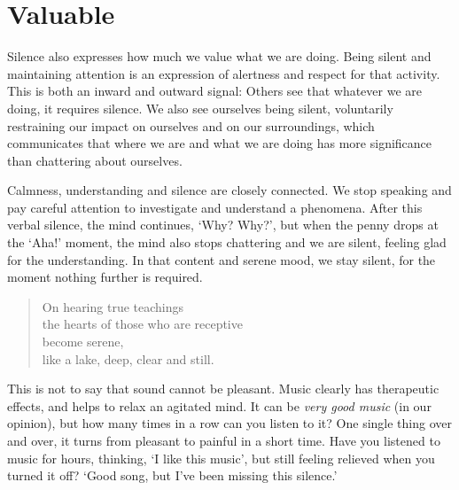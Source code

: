 \section{Valuable}


Silence also expresses how much we value what we are doing. Being silent
and maintaining attention is an expression of alertness and respect for
that activity. This is both an inward and outward signal: Others see
that whatever we are doing, it requires silence. We also see ourselves
being silent, voluntarily restraining our impact on ourselves and on our
surroundings, which communicates that where we are and what we are doing
has more significance than chattering about ourselves.

Calmness, understanding and silence are closely connected. We stop
speaking and pay careful attention to investigate and understand a
phenomena. After this verbal silence, the mind continues, `Why? Why?',
but when the penny drops at the `Aha!' moment, the mind also stops
chattering and we are silent, feeling glad for the understanding. In
that content and serene mood, we stay silent, for the moment nothing
further is required.

\begin{quote}
On hearing true teachings\\
the hearts of those who are receptive\\
become serene,\\
like a lake, deep, clear and still.

\bigskip

\end{quote}

This is not to say that sound cannot be pleasant. Music clearly has
therapeutic effects, and helps to relax an agitated mind. It can be
\emph{very good music} (in our opinion), but how many times in a row can
you listen to it? One single thing over and over, it turns from pleasant
to painful in a short time. Have you listened to music for hours,
thinking, `I like this music', but still feeling relieved when you
turned it off? `Good song, but I've been missing this silence.'

